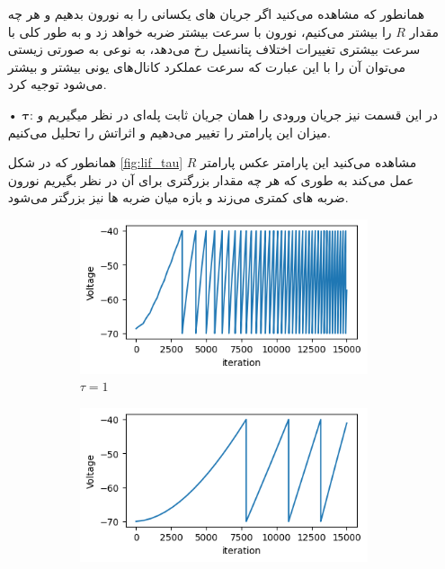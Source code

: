 \documentclass[12pt]{extreport}
\theoremstyle{definition}
\begin{document}
\begin{itemize}
همانطور که مشاهده می‌کنید اگر جریان های یکسانی را به نورون بدهیم و هر چه مقدار $R$ را بیشتر می‌کنیم، نورون با سرعت بیشتر ضربه خواهد زد و به طور کلی با سرعت بیشتری تغییرات اختلاف پتانسیل رخ می‌دهد، به نوعی به صورتی زیستی می‌توان آن را با این عبارت که سرعت عملکرد کانال‌های یونی بیشتر و بیشتر می‌شود توجیه کرد.
 
\item[•] $\mathbf{\tau}$:
در این قسمت نیز جریان ورودی را همان جریان ثابت پله‌ای در نظر میگیریم و میزان این پارامتر را تغییر می‌دهیم و اثراتش را تحلیل می‌کنیم.


همانطور که در شکل \ref{fig:lif_tau} مشاهده می‌کنید این پارامتر عکس پارامتر $R$ عمل می‌کند به طوری که هر چه مقدار بزرگتری برای آن در نظر بگیریم نورون ضربه های کمتری می‌زند و بازه میان ضربه ها نیز بزرگتر می‌شود.

\begin{figure}[H]
\centering
  \begin{subfigure}[b]{0.45\textwidth}
    \includegraphics[width=\textwidth]{Figs/lif_tau=1.png}
    \caption{$\tau=1$}
  \end{subfigure}
  \hfill
  \begin{subfigure}[b]{0.45\textwidth}
    \includegraphics[width=\textwidth]{Figs/lif_tau=10.png}

\end{subfigure}
\end{figure}
\end{itemize}
\end{document}
